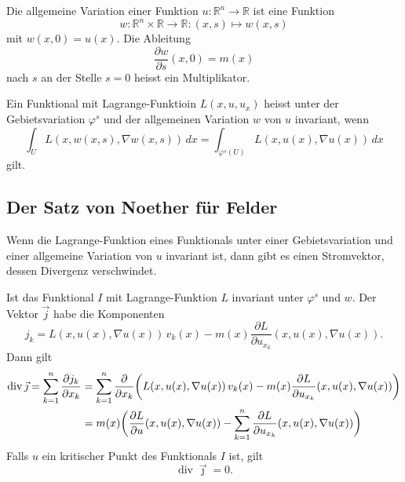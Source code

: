 \begin{definition}
Die allgemeine Variation einer Funktion
\(
u
\colon
\mathbb{R}^n\to \mathbb{R}
\)
ist eine Funktion
\[
w
\colon
\mathbb{R}^n \times\mathbb{R}
\to
\mathbb{R}
:
(x,s)
\mapsto
w(x,s)
\]
mit $w(x,0)=u(x)$.
Die Ableitung
\[
\frac{\partial w}{\partial s}(x,0) = m(x)
\]
nach $s$ an der Stelle $s=0$ heisst ein Multiplikator.
\end{definition}

\begin{definition}
Ein Funktional mit Lagrange-Funktioin
$L(x,u,u_x)$ heisst unter der Gebietsvariation $\varphi^s$ und
der allgemeinen Variation $w$ von $u$ invariant, wenn
\begin{equation}
\int_U
L(x,w(x,s),\nabla w(x,s))\,dx
=
\int_{\varphi^s(U)}
L(x,u(x),\nabla u(x))\,dx
\label{buch:symmetrien:felder:eqn:invarianz}
\end{equation}
gilt.
\end{definition}

%
%
\subsection{Der Satz von Noether für Felder}
Wenn die Lagrange-Funktion eines Funktionals unter einer Gebietsvariation
und einer allgemeine Variation von $u$ invariant ist, dann gibt es einen
Stromvektor, dessen Divergenz verschwindet.

\begin{satz}
Ist das Funktional $I$ mit Lagrange-Funktion $L$ invariant unter $\varphi^s$
und $w$.
Der Vektor $\vec{j}$ habe die Komponenten
\[
j_k
=
L(x,u(x),\nabla u(x))\,v_k(x)
-
m(x)
\frac{\partial L}{\partial u_{x_k}}(x,u(x),\nabla u(x)).
\]
Dann gilt
\begin{align}
\operatorname{div}\vec{\jmath}
=
\sum_{k=1}^n \frac{\partial j_k}{\partial x_k}
&=
\sum_{k=1}^n
\frac{\partial }{\partial x_k}
\biggl(
L(x,u(x),\nabla u(x))\,v_k(x)
-
m(x)
\frac{\partial L}{\partial u_{x_k}}
(x,u(x),\nabla u(x))
\biggr)
\notag
\\
&=
m(x)\biggl(
\frac{\partial L}{\partial u}(x,u(x),\nabla u(x))
-
\sum_{k=1}^n\frac{\partial L}{\partial u_{x_k}}(x,u(x),\nabla u(x))
\biggr)
\label{buch:symmetrien:felder:eqn:rhs}
\end{align}
Falls $u$ ein kritischer Punkt des Funktionals $I$ ist, gilt
\[
\operatorname{div}\vec{\jmath}=0.
\]
\end{satz}

